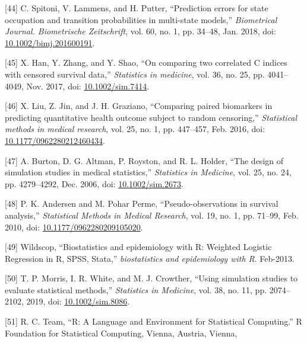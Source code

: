 \documentclass[12pt,PhD,twoside,openright]{muthesis}
\newenvironment{cslreferences}%
  {}%
  {\par}
\begin{document}
\begin{cslreferences}
\leavevmode\hypertarget{ref-spitoni_prediction_2018}{}%
{[}44{]} C. Spitoni, V. Lammens, and H. Putter, ``Prediction errors for state occupation and transition probabilities in multi-state models,'' \emph{Biometrical Journal. Biometrische Zeitschrift}, vol. 60, no. 1, pp. 34--48, Jan. 2018, doi: \href{https://doi.org/10.1002/bimj.201600191}{10.1002/bimj.201600191}.

\leavevmode\hypertarget{ref-han_comparing_2017}{}%
{[}45{]} X. Han, Y. Zhang, and Y. Shao, ``On comparing two correlated C indices with censored survival data,'' \emph{Statistics in medicine}, vol. 36, no. 25, pp. 4041--4049, Nov. 2017, doi: \href{https://doi.org/10.1002/sim.7414}{10.1002/sim.7414}.

\leavevmode\hypertarget{ref-liu_comparing_2016}{}%
{[}46{]} X. Liu, Z. Jin, and J. H. Graziano, ``Comparing paired biomarkers in predicting quantitative health outcome subject to random censoring,'' \emph{Statistical methods in medical research}, vol. 25, no. 1, pp. 447--457, Feb. 2016, doi: \href{https://doi.org/10.1177/0962280212460434}{10.1177/0962280212460434}.

\leavevmode\hypertarget{ref-burton_design_2006}{}%
{[}47{]} A. Burton, D. G. Altman, P. Royston, and R. L. Holder, ``The design of simulation studies in medical statistics,'' \emph{Statistics in Medicine}, vol. 25, no. 24, pp. 4279--4292, Dec. 2006, doi: \href{https://doi.org/10.1002/sim.2673}{10.1002/sim.2673}.

\leavevmode\hypertarget{ref-andersen_pseudo-observations_2010}{}%
{[}48{]} P. K. Andersen and M. Pohar Perme, ``Pseudo-observations in survival analysis,'' \emph{Statistical Methods in Medical Research}, vol. 19, no. 1, pp. 71--99, Feb. 2010, doi: \href{https://doi.org/10.1177/0962280209105020}{10.1177/0962280209105020}.

\leavevmode\hypertarget{ref-wildscop_biostatistics_2013}{}%
{[}49{]} Wildscop, ``Biostatistics and epidemiology with R: Weighted Logistic Regression in R, SPSS, Stata,'' \emph{biostatistics and epidemiology with R}. Feb-2013.

\leavevmode\hypertarget{ref-morris_using_2019}{}%
{[}50{]} T. P. Morris, I. R. White, and M. J. Crowther, ``Using simulation studies to evaluate statistical methods,'' \emph{Statistics in Medicine}, vol. 38, no. 11, pp. 2074--2102, 2019, doi: \href{https://doi.org/10.1002/sim.8086}{10.1002/sim.8086}.

\leavevmode\hypertarget{ref-r_core_team_r_nodate}{}%
{[}51{]} R. C. Team, ``R: A Language and Environment for Statistical Computing.'' R Foundation for Statistical Computing, Vienna, Austria, Vienna,


\end{cslreferences}
\end{document}
